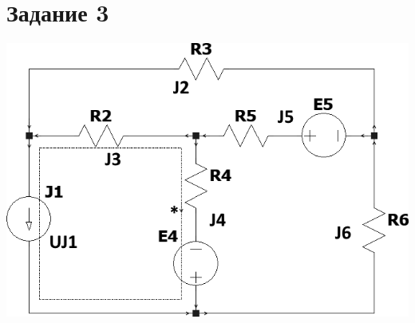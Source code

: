 \documentclass[12pt]{article}
\begin{document}
		\section*{Задание 3}
		\begin{center}
			{\includegraphics[scale=0.8]{7}}
			\par\bigskip
		\end{center}
		
\end{document}
